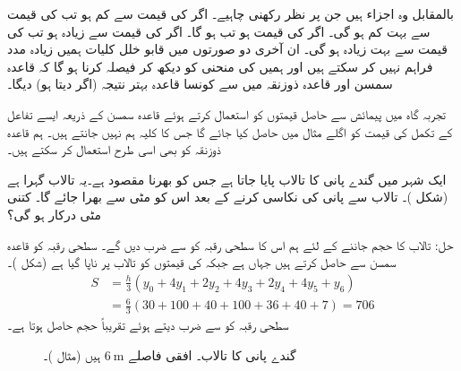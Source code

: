  بالمقابل  وہ اجزاء ہیں جن پر نظر رکھنی چاہیے۔ اگر  کی قیمت  سے کم ہو تب  کی قیمت  سے بہت کم ہو گی۔ اگر  کی قیمت  ہو تب  ہو گا۔ اگر  کی قیمت  سے زیادہ ہو تب  کی قیمت  سے بہت زیادہ ہو گی۔ ان آخری دو صورتوں میں قابو خلل کلیات  ہمیں زیادہ مدد فراہم نہیں کر سکتے ہیں اور ہمیں  کی منحنی کو دیکھ کر فیصلہ کرنا ہو گا کہ  قاعدہ سمسن اور قاعدہ ذوزنقہ میں سے کونسا قاعدہ بہتر نتیجہ (اگر دیتا ہو) دیگا۔

تجربہ گاہ میں پیمائش سے حاصل قیمتوں کو استعمال کرتے ہوئے قاعدہ سمسن کے ذریعہ ایسے تفاعل کے تکمل کی قیمت کو اگلے مثال میں حاصل کیا جائے گا جس کا کلیہ ہم  نہیں جانتے ہیں۔ ہم قاعدہ ذوزنقہ کو بھی اسی طرح  استعمال کر سکتے ہیں۔

ایک شہر میں گندے پانی کا تالاب پایا جاتا ہے جس کو بھرنا مقصود ہے۔یہ تالاب  گہرا ہے (شکل )۔ تالاب سے پانی کی نکاسی کرنے کے بعد اس کو مٹی سے بھرا جائے گا۔ کتنی مٹی درکار ہو گی؟ 

حل:\quad
تالاب کا حجم جاننے کے لئے ہم اس کا سطحی رقبہ کو  سے ضرب دیں گے۔ سطحی رقبہ کو قاعدہ سمسن سے حاصل کرتے ہیں جہاں  ہے جبکہ  کی قیمتوں کو تالاب پر ناپا گیا ہے (شکل )۔
\begin{align*}
S&=\frac{h}{3}(y_0+4y_1+2y_2+4y_3+2y_4+4y_5+y_6)\\
&=\frac{6}{3}(30+100+40+100+36+40+7)=706
\end{align*}
سطحی رقبہ کو  سے ضرب دیتے ہوئے تقریباً  حجم حاصل ہوتا ہے۔
\begin{figure}
\centering
{}
\caption{گندے پانی کا تالاب۔ افقی فاصلے $\SI{6}{\meter}$ ہیں (مثال )۔}
\label{شکل_مثال_تکمل_گندے_پانی_کا_تالاب}
\end{figure}


